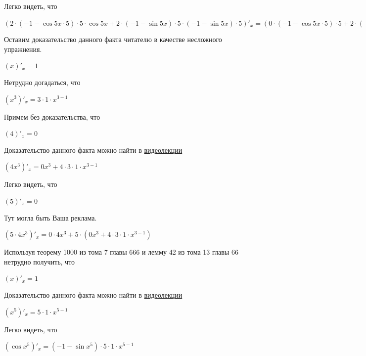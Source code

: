 \documentclass[12pt,a4paper,fleqn]{article}
\theoremstyle{definition}
\begin{document}
Легко видеть, что 

$( 2  \cdot ( -1  - \cos 5  x  \cdot  5 ) \cdot  5  \cdot \cos 5  x  +  2  \cdot ( -1  - \sin 5  x ) \cdot  5  \cdot ( -1  - \sin 5  x ) \cdot  5 )'_{x} = ( 0  \cdot ( -1  - \cos 5  x  \cdot  5 ) \cdot  5  +  2  \cdot (( 0  - ( -1  - \sin 5  x ) \cdot ( 0  x  +  5  \cdot  1 ) \cdot  5  + \cos 5  x  \cdot  0 ) \cdot  5  + ( -1  - \cos 5  x  \cdot  5 ) \cdot  0 )) \cdot \cos 5  x  +  2  \cdot ( -1  - \cos 5  x  \cdot  5 ) \cdot  5  \cdot ( -1  - \sin 5  x ) \cdot ( 0  x  +  5  \cdot  1 ) + ( 0  \cdot ( -1  - \sin 5  x ) \cdot  5  +  2  \cdot (( 0  - \cos 5  x  \cdot ( 0  x  +  5  \cdot  1 )) \cdot  5  + ( -1  - \sin 5  x ) \cdot  0 )) \cdot ( -1  - \sin 5  x ) \cdot  5  +  2  \cdot ( -1  - \sin 5  x ) \cdot  5  \cdot (( 0  - \cos 5  x  \cdot ( 0  x  +  5  \cdot  1 )) \cdot  5  + ( -1  - \sin 5  x ) \cdot  0 )$

Оставим доказательство данного факта читателю в качестве несложного упражнения. 

$( x )'_{x} =  1 $

Нетрудно догадаться, что 

$({ x }^{ 3 })'_{x} =  3  \cdot  1  \cdot { x }^{ 3  -  1 }$

Примем без доказательства, что 

$( 4 )'_{x} =  0 $

Доказательство данного факта можно найти в \href{https://www.youtube.com/watch?v=dQw4w9WgXcQ}{видеолекции} 

$( 4 { x }^{ 3 })'_{x} =  0 { x }^{ 3 } +  4  \cdot  3  \cdot  1  \cdot { x }^{ 3  -  1 }$

Легко видеть, что 

$( 5 )'_{x} =  0 $

Тут могла быть Ваша реклама. 

$( 5  \cdot  4 { x }^{ 3 })'_{x} =  0  \cdot  4 { x }^{ 3 } +  5  \cdot ( 0 { x }^{ 3 } +  4  \cdot  3  \cdot  1  \cdot { x }^{ 3  -  1 })$

Используя теорему 1000 из тома 7 главы 666 и лемму 42 из тома 13 главы 66 нетрудно получить, что 

$( x )'_{x} =  1 $

Доказательство данного факта можно найти в \href{https://www.youtube.com/watch?v=dQw4w9WgXcQ}{видеолекции} 

$({ x }^{ 5 })'_{x} =  5  \cdot  1  \cdot { x }^{ 5  -  1 }$

Легко видеть, что 

$(\cos{ x }^{ 5 })'_{x} = ( -1  - \sin{ x }^{ 5 }) \cdot  5  \cdot  1  \cdot { x }^{ 5  -  1 }$
\end{document}
